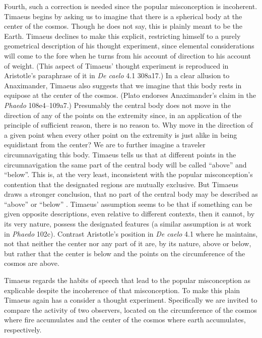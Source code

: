Fourth, such a correction is needed since the popular misconception is incoherent. Timaeus begins by asking us to imagine that there is a spherical body at the center of the cosmos. Though he does not say, this is plainly meant to be the Earth. Timaeus declines to make this explicit, restricting himself to a purely geometrical description of his thought experiment, since elemental considerations will come to the fore when he turns from his account of direction to his account of weight. (This aspect of Timaeus' thought experiment is reproduced in Aristotle's paraphrase of it in \emph{De caelo} 4.1 308a17.) In a clear allusion to Anaximander, Timaeus also suggests that we imagine that this body rests in equipose at the center of the cosmos. (Plato endorses Anaximander's claim in the \emph{Phaedo} 108e4--109a7.) Presumably the central body does not move in the direction of any of the points on the extremity since, in an application of the principle of sufficient reason, there is no reason to. Why move in the direction of a given point when every other point on the extremity is just alike in being equidistant from the center? We are to further imagine a traveler circumnavigating this body. Timaeus tells us that at different points in the circumnavigation the same part of the central body will be called ``above'' and ``below''. This is, at the very least, inconsistent with the popular misconception's contention that the designated regions are mutually exclusive. But Timaeus draws a stronger conclusion, that no part of the central body may be described as ``above'' or ``below'' \citep[23--24]{OBrien:1984ji}. Timaeus' assumption seems to be that if something can be given opposite descriptions, even relative to different contexts, then it cannot, by its very nature, possess the designated features (a similar assumption is at work in \emph{Phaedo} 102c). Contrast Aristotle's position in \emph{De caelo} 4.1 where he maintains, not that neither the center nor any part of it are, by its nature, above or below, but rather that the center is below and the points on the circumference of the cosmos are above.

Timaeus regards the habits of speech that lead to the popular misconception as explicable despite the incoherence of that misconception. To make this plain Timaeus again has a consider a thought experiment. Specifically we are invited to compare the activity of two observers, located on the circumference of the cosmos where fire accumulates and the center of the cosmos where earth accumulates, respectively.

